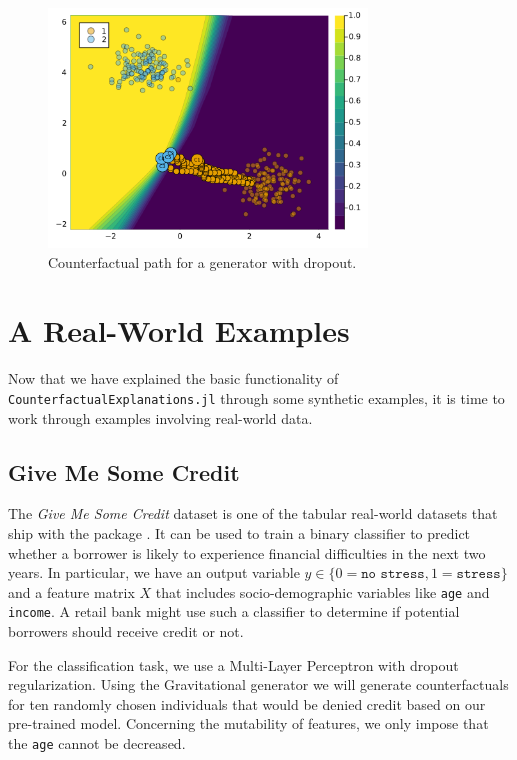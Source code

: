 \documentclass[
  letterpaper,
  DIV=11,
  numbers=noendperiod]{scrartcl}
\begin{document}
\begin{figure}

{\centering \includegraphics[width=3.33333in,height=2.5in]{www/dropout.png}

}

\caption{\label{fig-dropout}Counterfactual path for a generator with
dropout.}

\end{figure}

\hypertarget{sec-emp}{%
\section{A Real-World Examples}\label{sec-emp}}

Now that we have explained the basic functionality of
\texttt{CounterfactualExplanations.jl} through some synthetic examples,
it is time to work through examples involving real-world data.

\hypertarget{give-me-some-credit}{%
\subsection{Give Me Some Credit}\label{give-me-some-credit}}

The \emph{Give Me Some Credit} dataset is one of the tabular real-world
datasets that ship with the package \cite{kaggle2011give}. It can be
used to train a binary classifier to predict whether a borrower is
likely to experience financial difficulties in the next two years. In
particular, we have an output variable
\(y \in \{0=\texttt{no stress},1=\texttt{stress}\}\) and a feature
matrix \(X\) that includes socio-demographic variables like \texttt{age}
and \texttt{income}. A retail bank might use such a classifier to
determine if potential borrowers should receive credit or not.

For the classification task, we use a Multi-Layer Perceptron with
dropout regularization. Using the Gravitational generator
\cite{altmeyer2023endogenous} we will generate counterfactuals for ten
randomly chosen individuals that would be denied credit based on our
pre-trained model. Concerning the mutability of features, we only impose
that the \texttt{age} cannot be decreased.
\end{document}
